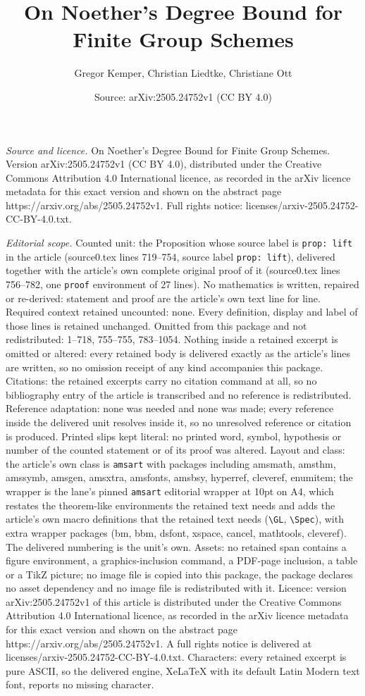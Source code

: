 \documentclass[10pt,a4paper]{amsart}
\title[On Noether's Degree Bound for Finite Group Schemes]{On Noether's Degree Bound for Finite Group Schemes}
\author{Gregor Kemper, Christian Liedtke, Christiane Ott}
\date{Source: arXiv:2505.24752v1 (CC BY 4.0)}
\begin{document}
\maketitle

\noindent\emph{Source and licence.} On Noether's Degree Bound for Finite Group Schemes. Version arXiv:2505.24752v1 (CC BY 4.0), distributed under the Creative Commons Attribution 4.0 International licence, as recorded in the arXiv licence metadata for this exact version and shown on the abstract page https://arxiv.org/abs/2505.24752v1. Full rights notice: licenses/arxiv-2505.24752-CC-BY-4.0.txt.\par\smallskip

\noindent\textit{Editorial scope.} Counted unit: the Proposition whose source label is \texttt{prop: lift} in the article (source0.tex lines 719--754, source label \texttt{prop: lift}), delivered together with the article's own complete original proof of it (source0.tex lines 756--782, one \texttt{proof} environment of 27 lines). No mathematics is written, repaired or re-derived: statement and proof are the article's own text line for line. Required context retained uncounted: none. Every definition, display and label of those lines is retained unchanged. Omitted from this package and not redistributed: 1--718, 755--755, 783--1054. Nothing inside a retained excerpt is omitted or altered: every retained body is delivered exactly as the article's lines are written, so no omission receipt of any kind accompanies this package. Citations: the retained excerpts carry no citation command at all, so no bibliography entry of the article is transcribed and no reference is redistributed. Reference adaptation: none was needed and none was made; every reference inside the delivered unit resolves inside it, so no unresolved reference or citation is produced. Printed slips kept literal: no printed word, symbol, hypothesis or number of the counted statement or of its proof was altered. Layout and class: the article's own class is \texttt{amsart} with packages including amsmath, amsthm, amssymb, amsgen, amsxtra, amsfonts, amsbsy, hyperref, cleveref, enumitem; the wrapper is the lane's pinned \texttt{amsart} editorial wrapper at 10pt on A4, which restates the theorem-like environments the retained text needs and adds the article's own macro definitions that the retained text needs (\texttt{\textbackslash GL}, \texttt{\textbackslash Spec}), with extra wrapper packages (bm, bbm, dsfont, xspace, cancel, mathtools, cleveref). The delivered numbering is the unit's own. Assets: no retained span contains a figure environment, a graphics-inclusion command, a PDF-page inclusion, a table or a TikZ picture; no image file is copied into this package, the package declares no asset dependency and no image file is redistributed with it. Licence: version arXiv:2505.24752v1 of this article is distributed under the Creative Commons Attribution 4.0 International licence, as recorded in the arXiv licence metadata for this exact version and shown on the abstract page https://arxiv.org/abs/2505.24752v1. A full rights notice is delivered at licenses/arxiv-2505.24752-CC-BY-4.0.txt. Characters: every retained excerpt is pure ASCII, so the delivered engine, XeLaTeX with its default Latin Modern text font, reports no missing character.
\end{document}
